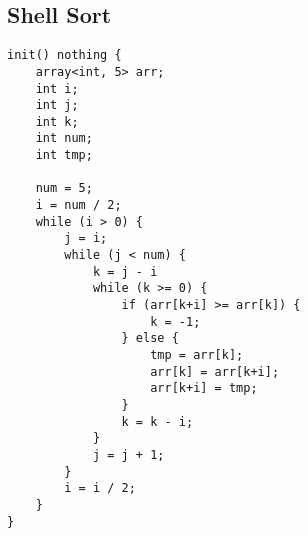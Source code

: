 \documentclass[a4paper,12pt]{article}
\begin{document}
\pagebreak

\subsection{Shell Sort}
\begin{lstlisting}
init() nothing {
    array<int, 5> arr;
    int i;
    int j;
    int k;
    int num;
    int tmp;
    
    num = 5;
    i = num / 2;
    while (i > 0) {
        j = i;
        while (j < num) {
            k = j - i
            while (k >= 0) {
                if (arr[k+i] >= arr[k]) {
                    k = -1;
                } else {
                    tmp = arr[k];
                    arr[k] = arr[k+i];
                    arr[k+i] = tmp;
                }
                k = k - i;
            }
            j = j + 1;
        }
        i = i / 2;
    }
}
\end{lstlisting}
\end{document}
